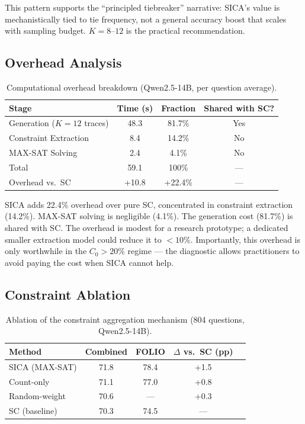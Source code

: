 \documentclass[11pt]{article}
\begin{document}
This pattern supports the ``principled tiebreaker'' narrative: SICA's value is mechanistically tied to tie frequency, not a general accuracy boost that scales with sampling budget. $K = 8$--$12$ is the practical recommendation.

\subsection{Overhead Analysis}

\begin{table}[t]
\centering
\caption{Computational overhead breakdown (Qwen2.5-14B, per question average).}
\label{tab:overhead}
\small
\begin{tabular}{@{}lccc@{}}
\toprule
Stage & Time (s) & Fraction & Shared with SC? \\
\midrule
Generation ($K=12$ traces) & 48.3 & 81.7\% & Yes \\
Constraint Extraction & 8.4 & 14.2\% & No \\
MAX-SAT Solving & 2.4 & 4.1\% & No \\
\midrule
Total & 59.1 & 100\% & --- \\
Overhead vs.\ SC & +10.8 & +22.4\% & --- \\
\bottomrule
\end{tabular}
\end{table}

SICA adds 22.4\% overhead over pure SC, concentrated in constraint extraction (14.2\%). MAX-SAT solving is negligible (4.1\%). The generation cost (81.7\%) is shared with SC. The overhead is modest for a research prototype; a dedicated smaller extraction model could reduce it to $<10\%$. Importantly, this overhead is only worthwhile in the $C_0 > 20\%$ regime --- the diagnostic allows practitioners to avoid paying the cost when SICA cannot help.

\subsection{Constraint Ablation}

\begin{table}[t]
\centering
\caption{Ablation of the constraint aggregation mechanism (804 questions, Qwen2.5-14B).}
\label{tab:ablation}
\small
\begin{tabular}{@{}lcccc@{}}
\toprule
Method & Combined & FOLIO & $\Delta$ vs.\ SC (pp) \\
\midrule
SICA (MAX-SAT) & 71.8 & 78.4 & +1.5 \\
Count-only & 71.1 & 77.0 & +0.8 \\
Random-weight & 70.6 & --- & +0.3 \\
SC (baseline) & 70.3 & 74.5 & --- \\
\bottomrule
\end{tabular}
\end{table}
\end{document}
